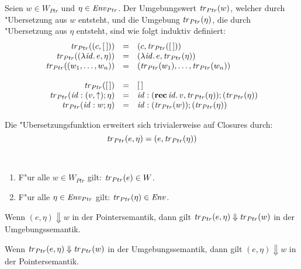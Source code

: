 \documentclass[12pt,fleqn,a4paper]{article}
\begin{document}
\begin{definition}["Ubersetzungsfunktion]
  Seien $w \in W_{Ptr}$ und $\eta \in {\text{\it Env\/}}_{Ptr}$. Der Umgebungswert ${\text{\it tr\/}}_{Ptr}(w)$, welcher durch "Ubersetzung
  aus $w$ entsteht, und die Umgebung ${\text{\it tr\/}}_{Ptr}(\eta)$, die durch "Ubersetzung aus $\eta$ entsteht, sind wie folgt
  induktiv definiert:
  \[\begin{array}{rcl}
    {\text{\it tr\/}}_{Ptr}((c,[\,])) &=& (c,{\text{\it tr\/}}_{Ptr}([\,])) \\
    {\text{\it tr\/}}_{Ptr}((\lambda {\text{\it id\/}}.\,e,\eta)) &=& (\lambda {\text{\it id\/}}.\,e,{\text{\it tr\/}}_{Ptr}(\eta)) \\
    {\text{\it tr\/}}_{Ptr}((w_1,\ldots,w_n)) &=& ({\text{\it tr\/}}_{Ptr}(w_1),\ldots,{\text{\it tr\/}}_{Ptr}(w_n)) \\
    \\
    {\text{\it tr\/}}_{Ptr}([\,]) &=& [\,] \\
    {\text{\it tr\/}}_{Ptr}({\text{\it id\/}}:(v,\uparrow);\eta) &=& {\text{\it id\/}}:(\mathbf{rec}\,{\text{\it id\/}}.\,v,{\text{\it tr\/}}_{Ptr}(\eta));({\text{\it tr\/}}_{Ptr}(\eta)) \\
    {\text{\it tr\/}}_{Ptr}({\text{\it id\/}}:w;\eta) &=& {\text{\it id\/}}:({\text{\it tr\/}}_{Ptr}(w));({\text{\it tr\/}}_{Ptr}(\eta)) \\
  \end{array}\]
\end{definition}

\noindent
Die "Ubersetzungsfunktion erweitert sich trivialerweise auf Closures durch:
\[{\text{\it tr\/}}_{Ptr}(e,\eta) = (e,{\text{\it tr\/}}_{Ptr}(\eta))\]

\begin{corollary} \
  \begin{enumerate}
  \item F"ur alle $w \in W_{Ptr}$ gilt: ${\text{\it tr\/}}_{Ptr}(e)\in W$.
  \item F"ur alle $\eta \in {\text{\it Env\/}}_{Ptr}$ gilt: ${\text{\it tr\/}}_{Ptr}(\eta) \in {\text{\it Env\/}}$.
  \end{enumerate}
\end{corollary}

\begin{theorem}
  Wenn $(e,\eta) \Downarrow w$ in der Pointersemantik, dann gilt
  ${\text{\it tr\/}}_{Ptr}(e,\eta) \Downarrow {\text{\it tr\/}}_{Ptr}(w)$ in der Umgebungssemantik.
\end{theorem}

\begin{theorem}
  Wenn ${\text{\it tr\/}}_{Ptr}(e,\eta) \Downarrow {\text{\it tr\/}}_{Ptr}(w)$ in der Umgebungssemantik,
  dann gilt $(e,\eta) \Downarrow w$ in der Pointersemantik.
\end{theorem}
\end{document}
